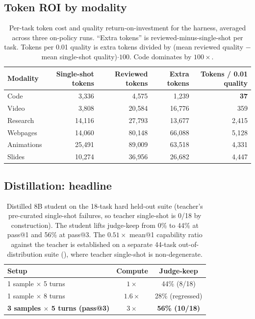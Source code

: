 \subsection{Token ROI by modality}
\begin{table}[H]
\centering
\caption{Per-task token cost and quality return-on-investment for the harness, averaged across three on-policy runs. ``Extra tokens'' is reviewed-minus-single-shot per task. Tokens per 0.01 quality is extra tokens divided by (mean reviewed quality $-$ mean single-shot quality)$\cdot 100$. Code dominates by $100\times$.}
\label{tab:harness-roi}
\small
\begin{tabular}{lrrrr}
\toprule
Modality & Single-shot tokens & Reviewed tokens & Extra tokens & Tokens / 0.01 quality \\
\midrule
Code        & 3{,}336  & 4{,}575  & 1{,}239  & \textbf{37} \\
Video       & 3{,}808  & 20{,}584 & 16{,}776 & 359 \\
Research    & 14{,}116 & 27{,}793 & 13{,}677 & 2{,}415 \\
Webpages    & 14{,}060 & 80{,}148 & 66{,}088 & 5{,}128 \\
Animations  & 25{,}491 & 89{,}009 & 63{,}518 & 4{,}331 \\
Slides      & 10{,}274 & 36{,}956 & 26{,}682 & 4{,}447 \\
\bottomrule
\end{tabular}
\end{table}

\subsection{Distillation: headline}
\begin{table}[H]
\centering
\caption{Distilled 8B student on the 18-task hard held-out suite (teacher's pre-curated single-shot failures, so teacher single-shot is 0/18 by construction). The student lifts judge-keep from 0\% to 44\% at pass@1 and 56\% at pass@3. The $0.51\times$ mean@1 capability ratio against the teacher is established on a separate 44-task out-of-distribution suite (), where teacher single-shot is non-degenerate.}
\label{tab:distill-headline}
\small
\begin{tabular}{lcc}
\toprule
Setup & Compute & Judge-keep \\
\midrule
1 sample $\times$ 5 turns                                  & $1\times$ & 44\% (8/18) \\
1 sample $\times$ 8 turns                                  & $1.6\times$ & 28\% (regressed) \\
\textbf{3 samples $\times$ 5 turns (pass@3)}               & $3\times$ & \textbf{56\% (10/18)} \\
\bottomrule
\end{tabular}
\end{table}

